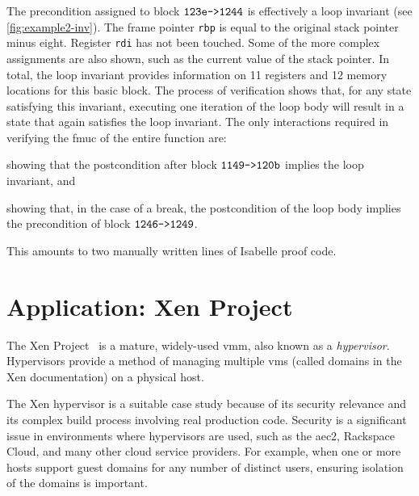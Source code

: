 The precondition assigned to block $\texttt{123e->1244}$%
is effectively a loop invariant (see \cref{fig:example2-inv}).%
The frame pointer \lstinline|rbp|%
is equal to the original stack pointer minus eight.%
Register \lstinline|rdi| has not been touched.
Some of the more complex assignments are also shown,
such as the current value of the stack pointer.
In total, the loop invariant provides information
on 11 registers and 12 memory locations for this basic block.%
The process of verification shows that,
for any state satisfying this invariant,
executing one iteration of the loop body
will result in a state that again satisfies the loop invariant.
The only interactions required in verifying the \ac{fmuc} of the entire function are:
\begin{enumerate*}
  \item showing that the postcondition after block $\texttt{1149->120b}$%
  implies the loop invariant, and
  \item showing that, in the case of a break, the postcondition of the loop body%
  implies the precondition of block $\texttt{1246->1249}$.
\end{enumerate*}
This amounts to two manually written lines of Isabelle proof code.  







\section{Application: Xen Project}\label{se:xen}
The Xen Project~\citep{chisnall2008definitive}%
is a mature, widely-used \ac{vmm}, also known as a \emph{hypervisor}.%
Hypervisors provide a method of managing multiple
\acp{vm} (called domains in the Xen documentation) on a physical host.%

The Xen hypervisor is a suitable case study because of its security relevance%
and its complex build process involving real production code.
Security is a significant issue in environments where hypervisors are used,
such as the \ac{aec2}, Rackspace Cloud, and many other cloud service providers.
For example, when one or more hosts support guest domains
for any number of distinct users,
ensuring isolation of the domains is important.

